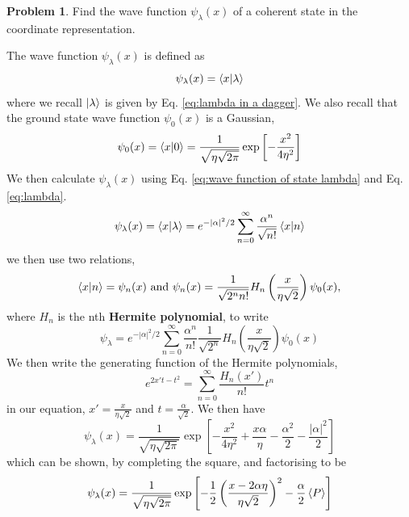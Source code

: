 \documentclass{article}
\theoremstyle{definition}
\newtheorem{definition}{Problem}[section]
\theoremstyle{remark}
\begin{document}
\begin{definition}
    Find the wave function $\psi_\lambda(x)$ of a coherent state in the coordinate representation.
\end{definition}
The wave function $\psi_\lambda(x)$ is defined as
\begin{equation}
    \label{eq:wave function of state lambda}
    \psi_\lambda(x) = \braket{x|\lambda}
\end{equation}
where we recall $\ket{\lambda}$ is given by Eq. \ref{eq:lambda in a dagger}. We also recall that the ground state wave function $\psi_0(x)$ is a Gaussian,
\begin{equation}
    \label{eq:psi_0}
    \psi_0(x) = \braket{x|0} = \frac{1}{\sqrt{\eta\sqrt{2\pi}}}\exp\left[-\frac{x^2}{4\eta^2}\right]
\end{equation}
We then calculate $\psi_\lambda(x)$ using Eq. \ref{eq:wave function of state lambda} and Eq. \ref{eq:lambda}.
\begin{equation*}
    \psi_\lambda(x) = \braket{x|\lambda} = e^{-|\alpha|^2/2}\sum_{n=0}^{\infty}\frac{\alpha^n}{\sqrt{n!}}\braket{x|n}
\end{equation*}
we then use two relations,
\begin{equation}
    \braket{x|n} = \psi_n(x) \text{ and } \psi_n(x) = \frac{1}{\sqrt{2^nn!}}H_n\left(\frac{x}{\eta\sqrt{2}}\right)\psi_0(x),
\end{equation}
where $H_n$ is the nth \textbf{Hermite polynomial}, to write
\begin{equation*}
    \psi_\lambda = e^{-|\alpha|^2/2}\sum_{n=0}^{\infty}\frac{\alpha^n}{n!}\frac{1}{\sqrt{2^n}}H_n\left(\frac{x}{\eta\sqrt{2}}\right)\psi_0(x)
\end{equation*}
We then write the generating function of the Hermite polynomials,
\begin{equation}
    \label{eq:generating function}
    e^{2x't-t^2} = \sum_{n=0}^{\infty}\frac{H_n(x')}{n!}t^n
\end{equation}
in our equation, $x' = \frac{x}{\eta\sqrt{2}}$ and $t = \frac{\alpha}{\sqrt{2}}$. We then have
\begin{equation*}
    \psi_\lambda(x) = \frac{1}{\sqrt{\eta\sqrt{2\pi}}}\exp\left[- \frac{x^2}{4\eta^2} + \frac{x\alpha}{\eta} - \frac{\alpha^2}{2}-\frac{|\alpha|^2}{2}\right] 
\end{equation*}
which can be shown, by completing the square, and factorising to be
\begin{equation}
    \label{eq:wave function of coherent state}
    \psi_\lambda(x) = \frac{1}{\sqrt{\eta\sqrt{2\pi}}}\exp\left[-\frac{1}{2}\left(\frac{x-2\alpha\eta}{\eta\sqrt{2}}\right)^2-\frac{\alpha}{2}\braket{P}\right]
\end{equation}
\end{document}
